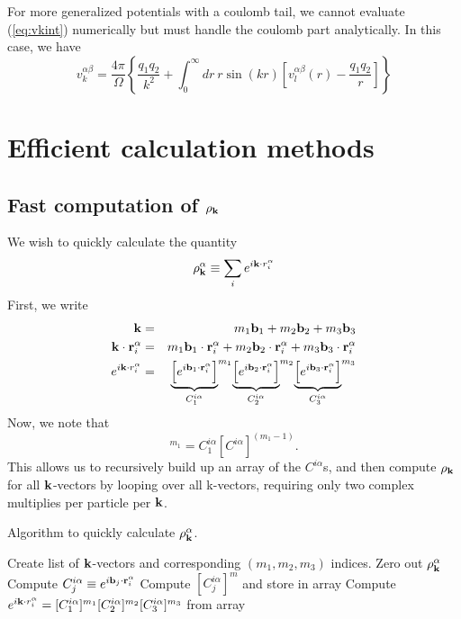 \documentclass{article}
\begin{document}
For more generalized potentials with a coulomb tail, we cannot
evaluate (\ref{eq:vkint}) numerically but must handle the coulomb part
analytically.  In this case, we have
\begin{equation}
v_k^{\alpha \beta} = \frac{4\pi}{\Omega} 
\left\{ \frac{q_1 q_2}{k^2} + \int_0^\infty dr \ r \sin(kr) \left[ v_l^{\alpha \beta}(r) -
  \frac{q_1 q_2}{r} \right] \right\}
\end{equation}

\section{Efficient calculation methods}
\subsection{Fast computation of $\rho_{\mathbf{k}}$}
We wish to quickly calculate the quantity
\begin{equation}
\rho_{\mathbf{k}}^\alpha \equiv \sum_i e^{i\mathbf{k} \cdot r_i^\alpha}
\end{equation}
First, we write 
\begin{eqnarray}
\mathbf{k} & = & m_1 \mathbf{b}_1 + m_2 \mathbf{b}_2 + m_3 \mathbf{b}_3 \\
\mathbf{k} \cdot \mathbf{r}_i^\alpha & = &  m_1 \mathbf{b}_1 \cdot \mathbf{r}_i^\alpha + 
m_2 \mathbf{b}_2 \cdot \mathbf{r}_i^\alpha + m_3 \mathbf{b}_3 \cdot \mathbf{r}_i^\alpha \\
e^{i\mathbf{k} \cdot r_i^\alpha} & = & 
{\underbrace{\left[e^{i \mathbf{b}_1 \cdot\mathbf{r}_i^\alpha}\right]}_{C^{i\alpha}_1}}^{m_1}
{\underbrace{\left[e^{i \mathbf{b}_2 \cdot\mathbf{r}_i^\alpha}\right]}_{C^{i\alpha}_2}}^{m_2}
{\underbrace{\left[e^{i \mathbf{b}_3 \cdot\mathbf{r}_i^\alpha}\right]}_{C^{i\alpha}_3}}^{m_3}
\end{eqnarray}
Now, we note that
\begin{equation}
[C^{i\alpha}_1]^{m_1} = C^{i\alpha}_1 [C^{i\alpha}]^{(m_1-1)}.
\end{equation}
This allows us to recursively build up an array of the $C^{i\alpha}$s,
and then compute $\rho_{\mathbf{k}}$ for all $\mathbf{k}$-vectors by looping over all
k-vectors, requiring only two complex multiplies per particle per
$\mathbf{k}$.
\begin{algorithm}
\caption{Algorithm to quickly calculate $\rho_{\mathbf{k}}^\alpha$.}
\begin{algorithmic}
\STATE Create list of $\mathbf{k}$-vectors and corresponding $(m_1, m_2,
m_3)$ indices.
  \STATE Zero out $\rho_{\mathbf{k}}^\alpha$
      \STATE Compute $C^{i \alpha}_j \equiv e^{i \mathbf{b}_j \cdot
	\mathbf{r}^{\alpha}_i}$
         \STATE Compute $[C^{i \alpha}_j]^m$ and store in array
       \ENDFOR
    \ENDFOR
       \STATE Compute $e^{i \mathbf{k} \cdot r^\alpha_i} =
	 [C^{i\alpha}_1]^{m_1} [C^{i\alpha}_2]^{m_2}
	 [C^{i\alpha}_3]^{m_3}$ from array
    \ENDFOR
  \ENDFOR
\ENDFOR
\end{algorithmic}
\end{algorithm}
\end{document}
